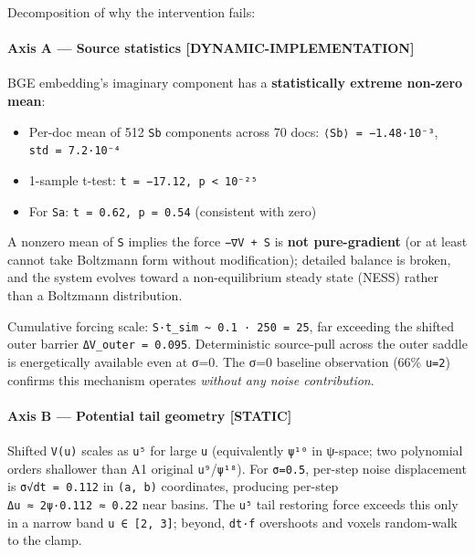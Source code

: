 \documentclass[
]{article}
\providecommand{\tightlist}{%
  \setlength{\itemsep}{0pt}\setlength{\parskip}{0pt}}
\begin{document}
Decomposition of why the intervention fails:

\hypertarget{axis-a-source-statistics-dynamic-implementation}{%
\paragraph{Axis A --- Source statistics
{[}DYNAMIC-IMPLEMENTATION{]}}\label{axis-a-source-statistics-dynamic-implementation}}

BGE embedding's imaginary component has a \textbf{statistically extreme
non-zero mean}:

\begin{itemize}
\tightlist
\item
  Per-doc mean of 512 \texttt{Sb} components across 70 docs:
  \texttt{⟨Sb⟩\ =\ −1.48·10⁻³}, \texttt{std\ =\ 7.2·10⁻⁴}
\item
  1-sample t-test: \texttt{t\ =\ −17.12,\ p\ \textless{}\ 10⁻²⁵}
\item
  For \texttt{Sa}: \texttt{t\ =\ 0.62,\ p\ =\ 0.54} (consistent with
  zero)
\end{itemize}

A nonzero mean of \texttt{S} implies the force \texttt{−∇V\ +\ S} is
\textbf{not pure-gradient} (or at least cannot take Boltzmann form
without modification); detailed balance is broken, and the system
evolves toward a non-equilibrium steady state (NESS) rather than a
Boltzmann distribution.

Cumulative forcing scale:
\texttt{\textbar{}S\textbar{}·t\_sim\ \textasciitilde{}\ 0.1\ ·\ 250\ =\ 25},
far exceeding the shifted outer barrier \texttt{ΔV\_outer\ =\ 0.095}.
Deterministic source-pull across the outer saddle is energetically
available even at σ=0. The σ=0 baseline observation (66\% \texttt{u=2})
confirms this mechanism operates \emph{without any noise contribution}.

\hypertarget{axis-b-potential-tail-geometry-static}{%
\paragraph{Axis B --- Potential tail geometry
{[}STATIC{]}}\label{axis-b-potential-tail-geometry-static}}

Shifted \texttt{V(u)} scales as \texttt{u⁵} for large \texttt{u}
(equivalently \texttt{\textbar{}ψ\textbar{}¹⁰} in ψ-space; two
polynomial orders shallower than A1 original
\texttt{u⁹}/\texttt{\textbar{}ψ\textbar{}¹⁸}). For \texttt{σ=0.5},
per-step noise displacement is \texttt{σ√dt\ =\ 0.112} in
\texttt{(a,\ b)} coordinates, producing per-step
\texttt{Δu\ ≈\ 2\textbar{}ψ\textbar{}·0.112\ ≈\ 0.22} near basins. The
\texttt{u⁵} tail restoring force exceeds this only in a narrow band
\texttt{u\ ∈\ {[}2,\ 3{]}}; beyond, \texttt{dt·\textbar{}f\textbar{}}
overshoots and voxels random-walk to the clamp.
\end{document}
